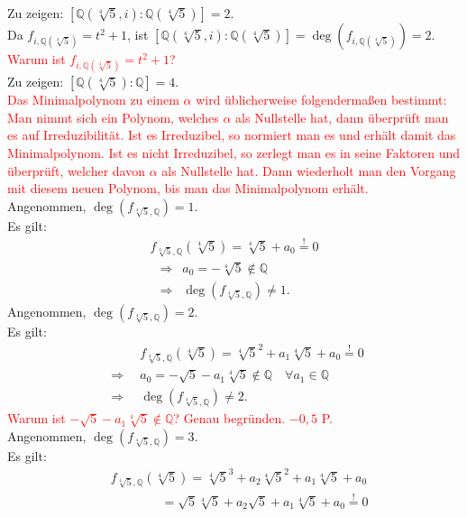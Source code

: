 \documentclass[12pt]{article}
\newcommand{\corr}[1]{\textcolor{red}{#1}}
\newcommand{\df}{\enspace\Longrightarrow\enspace}
\newcommand{\grad}{\operatorname{deg}}
\begin{document}
\begin{enumerate}
\begin{enumerate}
		Zu zeigen: $[\mathbb{Q}(\sqrt[4]{5},i):\mathbb{Q}(\sqrt[4]{5})]=2$. \\
		Da $f_{i,\mathbb{Q}(\sqrt[4]{5})}=t^2+1$, ist $[\mathbb{Q}(\sqrt[4]{5},i):\mathbb{Q}(\sqrt[4]{5})]=\grad(f_{i,\mathbb{Q}(\sqrt[4]{5})})=2$. \\
\corr{Warum ist $f_{i,\mathbb{Q}(\sqrt[4]{5})}=t^2+1$?}\\
		
		Zu zeigen: $[\mathbb{Q}(\sqrt[4]{5}):\mathbb{Q}]=4$. \\
\corr{Das Minimalpolynom zu einem $\alpha$ wird üblicherweise folgendermaßen bestimmt: Man nimmt sich ein Polynom, welches $\alpha$ als Nullstelle hat, dann überprüft man es auf Irreduzibilität. Ist es Irreduzibel, so normiert man es und erhält damit das Minimalpolynom. Ist es nicht Irreduzibel, so zerlegt man es in seine Faktoren und überprüft, welcher davon $\alpha$ als Nullstelle hat. Dann wiederholt man den Vorgang mit diesem neuen Polynom, bis man das Minimalpolynom erhält.}\\
		Angenommen, $\grad(f_{\sqrt[4]{5},\mathbb{Q}})=1$. \\
		Es gilt:
		\begin{align*}
			f_{\sqrt[4]{5},\mathbb{Q}}(\sqrt[4]{5})=\sqrt[4]{5}+a_0\overset{!}{=}0 \\
			\df a_0=-\sqrt[4]{5}\notin\mathbb{Q} \\
			\df \grad(f_{\sqrt[4]{5},\mathbb{Q}})\neq1.
		\end{align*}
		Angenommen, $\grad(f_{\sqrt[4]{5},\mathbb{Q}})=2$. \\
		Es gilt:
		\begin{align*}
			&f_{\sqrt[4]{5},\mathbb{Q}}(\sqrt[4]{5})=\sqrt[4]{5}^2+a_1\sqrt[4]{5}+a_0\overset{!}{=}0 \\
			\df &a_0=-\sqrt{5}-a_1\sqrt[4]{5}\notin\mathbb{Q}\quad\forall a_1\in\mathbb{Q} \\
			\df &\grad(f_{\sqrt[4]{5},\mathbb{Q}})\neq2.
		\end{align*}
\corr{Warum ist $-\sqrt{5}-a_1\sqrt[4]{5}\notin\mathbb{Q}$? Genau begründen. $-0,5$ P.}\\
		Angenommen, $\grad(f_{\sqrt[4]{5},\mathbb{Q}})=3$. \\
		Es gilt:
		\begin{align*}
			&f_{\sqrt[4]{5},\mathbb{Q}}(\sqrt[4]{5})=\sqrt[4]{5}^3+a_2\sqrt[4]{5}^2+a_1\sqrt[4]{5}+a_0 \\
			&\quad\quad\quad\quad=\sqrt{5}\sqrt[4]{5}+a_2\sqrt{5}+a_1\sqrt[4]{5}+a_0\overset{!}{=}0 \\

\end{align*}
\end{enumerate}
\end{enumerate}
\end{document}
